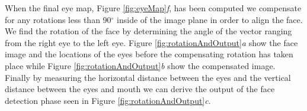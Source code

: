 When the final eye map, Figure \ref{fig:eyeMap}\textit{f}, has been computed we compensate for any rotations less than 90$^{\circ}$ inside of the image plane in order to align the face. We find the rotation of the face by determining the angle of the vector ranging from the right eye to the left eye. Figure \ref{fig:rotationAndOutput}\textit{a} show the face image and the locations of the eyes before the compensating rotation has taken place while Figure \ref{fig:rotationAndOutput}\textit{b} show the compensated image. Finally by measuring the horizontal distance between the eyes and the vertical distance between the eyes and mouth we can derive the output of the face detection phase seen in Figure \ref{fig:rotationAndOutput}\textit{c}.

\begin{figure}[H]
\centering


\end{figure}
